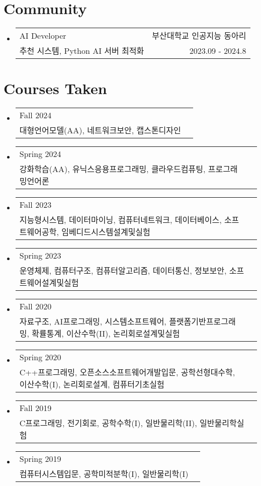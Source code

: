 \documentclass[letterpaper,11pt]{article}
\makeatletter
\newcommand{\resumeSkills}[2]{
  \item
    \begin{tabular*}{0.97\textwidth}[t]{l@{\extracolsep{\fill}}r}
      #1 \\ 
      {\small#2}
    \end{tabular*}\vspace{-5pt}
}
\newcommand{\resumeCommunity}[5]{
  \vspace{-1pt}\item
    \begin{tabular*}{0.97\textwidth}[t]{l@{\extracolsep{\fill}}r}
      {#1} & #2 \\
      {\small#3} {\small #4 \vspace{-2pt}} & {\small #5} \\
    \end{tabular*}\vspace{-5pt}
}
\newcommand{\resumeSubHeadingListStart}{\begin{itemize}[leftmargin=*]}
\newcommand{\resumeSubHeadingListEnd}{\end{itemize}}
\makeatother
\begin{document}
\section{Community}
  \resumeSubHeadingListStart
    \resumeCommunity{AI Developer}{부산대학교 인공지능 동아리}
      {추천 시스템, Python AI 서버 최적화}{}{2023.09 - 2024.8}
  \resumeSubHeadingListEnd

\section{Courses Taken}
  \resumeSubHeadingListStart
    \resumeSkills{{Fall 2024}}{대형언어모델(AA), 네트워크보안, 캡스톤디자인}
    \resumeSkills{{Spring 2024}}{강화학습(AA), 유닉스응용프로그래밍, 클라우드컴퓨팅, 프로그래밍언어론}
    \resumeSkills{{Fall 2023}}{지능형시스템, 데이터마이닝, 컴퓨터네트워크, 데이터베이스, 소프트웨어공학, 임베디드시스템설계및실험}
    \resumeSkills{{Spring 2023}}{운영체제, 컴퓨터구조, 컴퓨터알고리즘, 데이터통신, 정보보안, 소프트웨어설계및실험}
    \resumeSkills{{Fall 2020}}{자료구조, AI프로그래밍, 시스템소프트웨어, 플랫폼기반프로그래밍, 확률통계, 이산수학(II), 논리회로설계및실험}
    \resumeSkills{{Spring 2020}}{C++프로그래밍, 오픈소스소프트웨어개발입문, 공학선형대수학, 이산수학(I),  논리회로설계, 컴퓨터기초실험}
    \resumeSkills{{Fall 2019}}{C프로그래밍, 전기회로, 공학수학(I), 일반물리학(II), 일반물리학실험}
    \resumeSkills{{Spring 2019}}{컴퓨터시스템입문, 공학미적분학(I), 일반물리학(I)}
  \resumeSubHeadingListEnd
  



\end{document}
